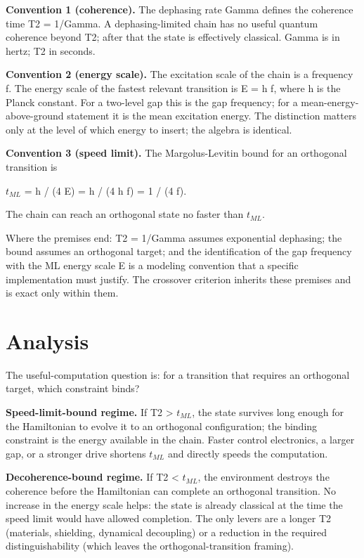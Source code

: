 \documentclass[11pt]{article}
\begin{document}
\textbf{Convention 1 (coherence).} The dephasing rate Gamma defines the coherence time T2 = 1/Gamma. A dephasing-limited chain has no useful quantum coherence beyond T2; after that the state is effectively classical. Gamma is in hertz; T2 in seconds.

\textbf{Convention 2 (energy scale).} The excitation scale of the chain is a frequency f. The energy scale of the fastest relevant transition is E = h f, where h is the Planck constant. For a two-level gap this is the gap frequency; for a mean-energy-above-ground statement it is the mean excitation energy. The distinction matters only at the level of which energy to insert; the algebra is identical.

\textbf{Convention 3 (speed limit).} The Margolus-Levitin bound for an orthogonal transition is

$t_{ML}$ = h / (4 E) = h / (4 h f) = 1 / (4 f).

The chain can reach an orthogonal state no faster than $t_{ML}$.

Where the premises end: T2 = 1/Gamma assumes exponential dephasing; the bound assumes an orthogonal target; and the identification of the gap frequency with the ML energy scale E is a modeling convention that a specific implementation must justify. The crossover criterion inherits these premises and is exact only within them.

\section{Analysis}
The useful-computation question is: for a transition that requires an orthogonal target, which constraint binds?

\textbf{Speed-limit-bound regime.} If T2 > $t_{ML}$, the state survives long enough for the Hamiltonian to evolve it to an orthogonal configuration; the binding constraint is the energy available in the chain. Faster control electronics, a larger gap, or a stronger drive shortens $t_{ML}$ and directly speeds the computation.

\textbf{Decoherence-bound regime.} If T2 < $t_{ML}$, the environment destroys the coherence before the Hamiltonian can complete an orthogonal transition. No increase in the energy scale helps: the state is already classical at the time the speed limit would have allowed completion. The only levers are a longer T2 (materials, shielding, dynamical decoupling) or a reduction in the required distinguishability (which leaves the orthogonal-transition framing).
\end{document}

